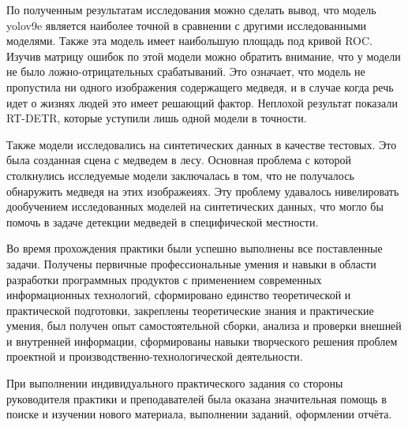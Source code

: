 \documentclass[../document.tex]{subfiles}
\begin{document}
	\par По полученным результатам исследования можно сделать вывод, что модель yolov9e является наиболее точной в сравнении с другими исследованными моделями. Также эта модель имеет наибольшую площадь под кривой ROC. Изучив матрицу ошибок по этой модели можно обратить внимание, что у модели не было ложно-отрицательных срабатываний. Это означает, что модель не пропустила ни одного изображения содержащего медведя, и в случае когда речь идет о жизнях людей это имеет решающий фактор. Неплохой результат показали RT-DETR, которые уступили лишь одной модели в точности.
	\par Также модели исследовались на синтетических данных в качестве тестовых. Это была созданная сцена с медведем в лесу. Основная проблема с которой  столкнулись исследуемые модели заключалась в том, что не получалось обнаружить медведя на этих изображеиях. Эту проблему удавалось нивелировать дообучением исследованных моделей на синтетических данных, что могло бы помочь в задаче детекции медведей в специфической местности.
    \par Во время прохождения практики были успешно выполнены все поставленные
 задачи. Получены первичные профессиональные умения и навыки в области разработки программных продуктов с применением современных информационных технологий, сформировано единство теоретической и практической подготовки, закреплены теоретические знания и практические умения, был получен опыт самостоятельной сборки, анализа и проверки внешней и внутренней информации, сформированы навыки творческого решения проблем проектной и производственно-технологической деятельности.
    \par При выполнении индивидуального практического задания со стороны руководителя практики и преподавателей была оказана значительная помощь в поиске и изучении нового материала, выполнении заданий, оформлении отчёта.
\end{document}
